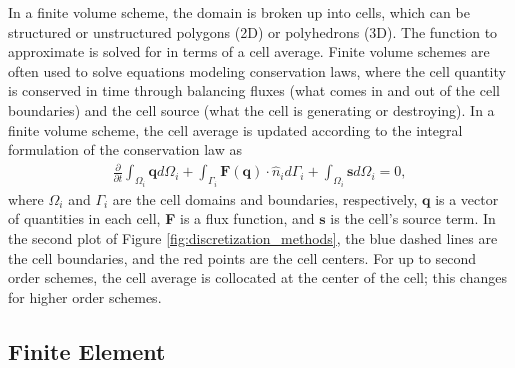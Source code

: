In a finite volume scheme, the domain is broken up into cells, which can be structured or unstructured polygons (2D) or polyhedrons (3D). The function to approximate is solved for in terms of a cell average. Finite volume schemes are often used to solve equations modeling conservation laws, where the cell quantity is conserved in time through balancing fluxes (what comes in and out of the cell boundaries) and the cell source (what the cell is generating or destroying). In a finite volume scheme, the cell average is updated according to the integral formulation of the conservation law as
\begin{align}
    \frac{\partial}{\partial t} \int_{\Omega_i} \textbf{q} d\Omega_i + \int_{\Gamma_i} \textbf{F}(\textbf{q}) \cdot \hat{n}_i d\Gamma_i + \int_{\Omega_i} \textbf{s} d\Omega_i = 0,
\end{align}
where $\Omega_i$ and $\Gamma_i$ are the cell domains and boundaries, respectively, $\textbf{q}$ is a vector of quantities in each cell, \textbf{F} is a flux function, and $\textbf{s}$ is the cell's source term. In the second plot of Figure \ref{fig:discretization_methods}, the blue dashed lines are the cell boundaries, and the red points are the cell centers. For up to second order schemes, the cell average is collocated at the center of the cell; this changes for higher order schemes.

\subsection{Finite Element}

